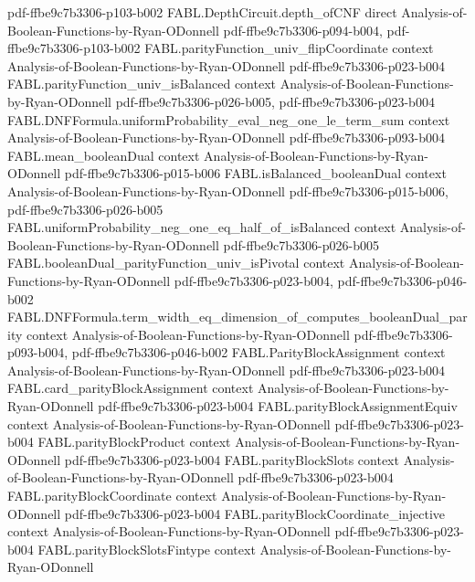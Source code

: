 \begin{theorem}
{    pdf-ffbe9c7b3306-p103-b002}
\proofstep
  {FABL.DepthCircuit.depth_ofCNF}
  {direct}
  {Analysis-of-Boolean-Functions-by-Ryan-ODonnell}
  {pdf-ffbe9c7b3306-p094-b004,
    pdf-ffbe9c7b3306-p103-b002}
\proofstep
  {FABL.parityFunction_univ_flipCoordinate}
  {context}
  {Analysis-of-Boolean-Functions-by-Ryan-ODonnell}
  {pdf-ffbe9c7b3306-p023-b004}
\proofstep
  {FABL.parityFunction_univ_isBalanced}
  {context}
  {Analysis-of-Boolean-Functions-by-Ryan-ODonnell}
  {pdf-ffbe9c7b3306-p026-b005,
    pdf-ffbe9c7b3306-p023-b004}
\proofstep
  {FABL.DNFFormula.uniformProbability_eval_neg_one_le_term_sum}
  {context}
  {Analysis-of-Boolean-Functions-by-Ryan-ODonnell}
  {pdf-ffbe9c7b3306-p093-b004}
\proofstep
  {FABL.mean_booleanDual}
  {context}
  {Analysis-of-Boolean-Functions-by-Ryan-ODonnell}
  {pdf-ffbe9c7b3306-p015-b006}
\proofstep
  {FABL.isBalanced_booleanDual}
  {context}
  {Analysis-of-Boolean-Functions-by-Ryan-ODonnell}
  {pdf-ffbe9c7b3306-p015-b006,
    pdf-ffbe9c7b3306-p026-b005}
\proofstep
  {FABL.uniformProbability_neg_one_eq_half_of_isBalanced}
  {context}
  {Analysis-of-Boolean-Functions-by-Ryan-ODonnell}
  {pdf-ffbe9c7b3306-p026-b005}
\proofstep
  {FABL.booleanDual_parityFunction_univ_isPivotal}
  {context}
  {Analysis-of-Boolean-Functions-by-Ryan-ODonnell}
  {pdf-ffbe9c7b3306-p023-b004,
    pdf-ffbe9c7b3306-p046-b002}
\proofstep
  {FABL.DNFFormula.term_width_eq_dimension_of_computes_booleanDual_parity}
  {context}
  {Analysis-of-Boolean-Functions-by-Ryan-ODonnell}
  {pdf-ffbe9c7b3306-p093-b004,
    pdf-ffbe9c7b3306-p046-b002}
\proofstep
  {FABL.ParityBlockAssignment}
  {context}
  {Analysis-of-Boolean-Functions-by-Ryan-ODonnell}
  {pdf-ffbe9c7b3306-p023-b004}
\proofstep
  {FABL.card_parityBlockAssignment}
  {context}
  {Analysis-of-Boolean-Functions-by-Ryan-ODonnell}
  {pdf-ffbe9c7b3306-p023-b004}
\proofstep
  {FABL.parityBlockAssignmentEquiv}
  {context}
  {Analysis-of-Boolean-Functions-by-Ryan-ODonnell}
  {pdf-ffbe9c7b3306-p023-b004}
\proofstep
  {FABL.parityBlockProduct}
  {context}
  {Analysis-of-Boolean-Functions-by-Ryan-ODonnell}
  {pdf-ffbe9c7b3306-p023-b004}
\proofstep
  {FABL.parityBlockSlots}
  {context}
  {Analysis-of-Boolean-Functions-by-Ryan-ODonnell}
  {pdf-ffbe9c7b3306-p023-b004}
\proofstep
  {FABL.parityBlockCoordinate}
  {context}
  {Analysis-of-Boolean-Functions-by-Ryan-ODonnell}
  {pdf-ffbe9c7b3306-p023-b004}
\proofstep
  {FABL.parityBlockCoordinate_injective}
  {context}
  {Analysis-of-Boolean-Functions-by-Ryan-ODonnell}
  {pdf-ffbe9c7b3306-p023-b004}
\proofstep
  {FABL.parityBlockSlotsFintype}
  {context}
  {Analysis-of-Boolean-Functions-by-Ryan-ODonnell}

\end{theorem}
